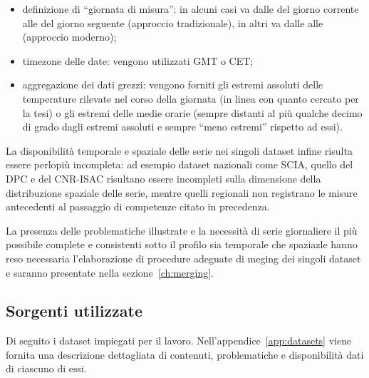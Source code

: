 \begin{itemize}
  \item
    definizione di ``giornata di misura'': in alcuni casi va dalle  del giorno corrente alle  del giorno seguente (approccio tradizionale), in altri va dalle  alle  (approccio moderno);
  \item
    timezone delle date: vengono utilizzati GMT o CET;
  \item
    aggregazione dei dati grezzi: vengono forniti gli estremi assoluti delle temperature rilevate nel corso della giornata (in linea con quanto cercato per la tesi) o gli estremi delle medie orarie (sempre distanti al più qualche decimo di grado dagli estremi assoluti e sempre ``meno estremi'' rispetto ad essi).
\end{itemize}

La disponibilità temporale e spaziale delle serie nei singoli dataset infine risulta essere perlopiù incompleta: ad esempio dataset nazionali come SCIA, quello del DPC e del CNR-ISAC risultano essere incompleti sulla dimensione della distribuzione spaziale delle serie, mentre quelli regionali non registrano le misure antecedenti al passaggio di competenze citato in precedenza.

La presenza delle problematiche illustrate e la necessità di serie giornaliere il più possibile complete e consistenti sotto il profilo sia temporale che spaziazle hanno reso necessaria l'elaborazione di procedure adeguate di meging dei singoli dataset e saranno presentate nella sezione~\ref{ch:merging}.

\subsection{Sorgenti utilizzate}\label{ch:sources}
Di seguito i dataset impiegati per il lavoro. Nell'appendice~\ref{app:datasets} viene fornita una descrizione dettagliata di contenuti, problematiche e disponibilità dati di ciascuno di essi.

